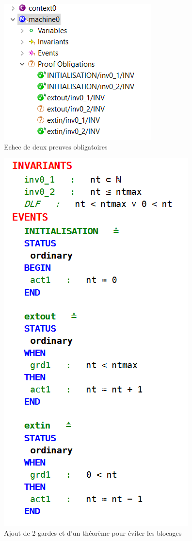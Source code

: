 \begin{figure}[H]
	\begin{center}	
		\includegraphics[scale=0.8]{images/proof1}
		\caption{Echec de deux preuves obligatoires}
		\label{proof1}
	\end{center}
\end{figure}

\begin{figure}[H]
	\begin{center}	
		\includegraphics[scale=0.8]{images/garde}
		\caption{Ajout de 2 gardes et d'un théorème pour éviter les blocages}
		\label{garde}
	\end{center}
\end{figure}

